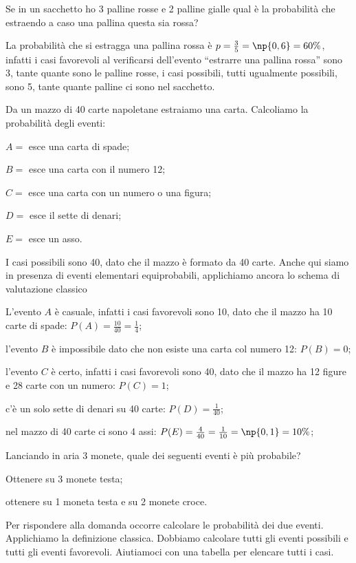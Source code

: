 \begin{exrig}
\begin{esempio}
Se in un sacchetto ho 3 palline rosse e 2 palline gialle qual è la probabilità che estraendo a caso una pallina questa sia rossa?

La probabilità che si estragga una pallina rossa è $p=\frac 3 5=\np{0,6}=60\text{\%}$, infatti i casi favorevoli al verificarsi dell'evento ``estrarre una pallina rossa'' sono 3, tante quante sono le palline rosse, i casi possibili, tutti ugualmente possibili, sono 5, tante quante palline ci sono nel sacchetto.
\end{esempio}

\begin{esempio}
Da un mazzo di 40 carte napoletane estraiamo una carta. Calcoliamo la probabilità degli eventi:
\begin{description*}
\item $A=$ esce una carta di spade;
\item $B=$ esce una carta con il numero 12;
\item $C=$ esce una carta con un numero o una figura;
\item $D=$ esce il sette di denari;
\item $E=$ esce un asso.
\end{description*}
I casi possibili sono 40, dato che il mazzo è formato da 40 carte. Anche qui siamo in presenza di eventi elementari equiprobabili, applichiamo ancora lo schema di valutazione classico
\begin{itemize*}
\item L'evento $A$ è casuale, infatti i casi favorevoli sono 10, dato che il mazzo ha 10 carte di spade: $P(A)=\frac{10}{40}=\frac 1 4$;
\item l'evento $B$ è impossibile dato che non esiste una carta col numero 12: $P(B)=0$;
\item l'evento $C$ è certo, infatti i casi favorevoli sono 40, dato che il mazzo ha 12 figure e 28 carte con un numero: $P(C)=1$;
\item c'è un solo sette di denari su 40 carte: $P(D)=\frac 1{40}$;
\item nel mazzo di 40 carte ci sono 4 assi: $P(E)=\frac 4{40}=\frac 1{10}=\np{0,1}=10\%$;
\end{itemize*}
\end{esempio}

\begin{esempio}
Lanciando in aria 3 monete, quale dei seguenti eventi è più probabile?
\begin{itemize*}
\item Ottenere su 3 monete testa;
\item ottenere su 1 moneta testa e su 2 monete croce.
\end{itemize*}
Per rispondere alla domanda occorre calcolare le probabilità dei due eventi. Applichiamo la definizione classica. Dobbiamo calcolare tutti gli eventi possibili e tutti gli eventi favorevoli.
Aiutiamoci con una tabella per elencare tutti i casi.


\end{esempio}
\end{exrig}
